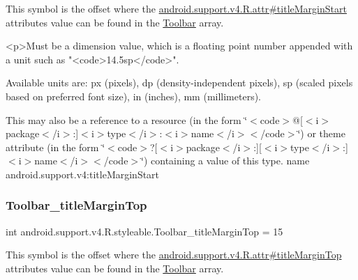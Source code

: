 This symbol is the offset where the \hyperlink{classandroid_1_1support_1_1v4_1_1R_1_1attr_ad5b0a1d0fcf3268e1431e0d357bb7cb8}{android.\+support.\+v4.\+R.\+attr\#title\+Margin\+Start} attribute\textquotesingle{}s value can be found in the \hyperlink{classandroid_1_1support_1_1v4_1_1R_1_1styleable_a211358a2f951023c7735caea0fb5ae04}{Toolbar} array.

\begin{DoxyVerb}      <p>Must be a dimension value, which is a floating point number appended with a unit such as "<code>14.5sp</code>".
\end{DoxyVerb}
 Available units are\+: px (pixels), dp (density-\/independent pixels), sp (scaled pixels based on preferred font size), in (inches), mm (millimeters). 

This may also be a reference to a resource (in the form \char`\"{}$<$code$>$@\mbox{[}$<$i$>$package$<$/i$>$\+:\mbox{]}$<$i$>$type$<$/i$>$\+:$<$i$>$name$<$/i$>$$<$/code$>$\char`\"{}) or theme attribute (in the form \char`\"{}$<$code$>$?\mbox{[}$<$i$>$package$<$/i$>$\+:\mbox{]}\mbox{[}$<$i$>$type$<$/i$>$\+:\mbox{]}$<$i$>$name$<$/i$>$$<$/code$>$\char`\"{}) containing a value of this type.  name android.\+support.\+v4\+:title\+Margin\+Start \mbox{\label{classandroid_1_1support_1_1v4_1_1R_1_1styleable_a4d1ca9c426378fcd3df61341e7cd11f1}} 
\subsubsection{\texorpdfstring{Toolbar\+\_\+title\+Margin\+Top}{Toolbar\_titleMarginTop}}
{\footnotesize\ttfamily int android.\+support.\+v4.\+R.\+styleable.\+Toolbar\+\_\+title\+Margin\+Top = 15\hspace{0.3cm}{\ttfamily [static]}}

This symbol is the offset where the \hyperlink{classandroid_1_1support_1_1v4_1_1R_1_1attr_a21cd245009a24be7a8a154fd9a167b5e}{android.\+support.\+v4.\+R.\+attr\#title\+Margin\+Top} attribute\textquotesingle{}s value can be found in the \hyperlink{classandroid_1_1support_1_1v4_1_1R_1_1styleable_a211358a2f951023c7735caea0fb5ae04}{Toolbar} array.


